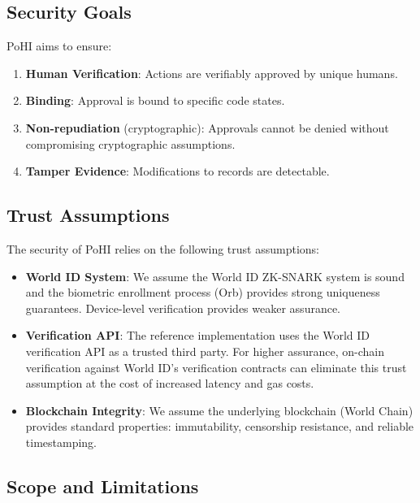 \documentclass[conference]{IEEEtran}
\begin{document}
\subsection{Security Goals}

PoHI aims to ensure:
\begin{enumerate}
    \item \textbf{Human Verification}: Actions are verifiably approved by unique humans.
    \item \textbf{Binding}: Approval is bound to specific code states.
    \item \textbf{Non-repudiation} (cryptographic): Approvals cannot be denied without compromising cryptographic assumptions.
    \item \textbf{Tamper Evidence}: Modifications to records are detectable.
\end{enumerate}

\subsection{Trust Assumptions}

The security of PoHI relies on the following trust assumptions:
\begin{itemize}
    \item \textbf{World ID System}: We assume the World ID ZK-SNARK system is sound and the biometric enrollment process (Orb) provides strong uniqueness guarantees. Device-level verification provides weaker assurance.
    \item \textbf{Verification API}: The reference implementation uses the World ID verification API as a trusted third party. For higher assurance, on-chain verification against World ID's verification contracts can eliminate this trust assumption at the cost of increased latency and gas costs.
    \item \textbf{Blockchain Integrity}: We assume the underlying blockchain (World Chain) provides standard properties: immutability, censorship resistance, and reliable timestamping.
\end{itemize}

\subsection{Scope and Limitations}
\end{document}
